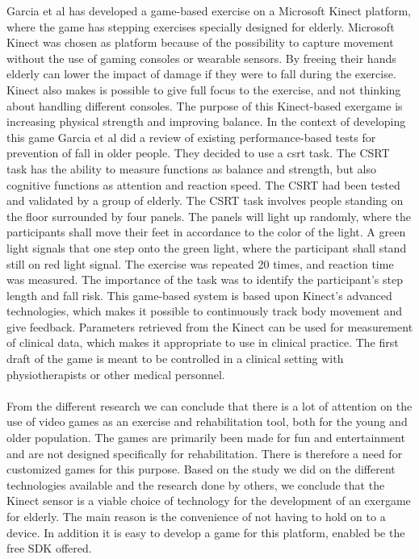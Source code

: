 Garcia et al has developed a game-based exercise on a Microsoft Kinect platform, where the game has stepping exercises specially designed for elderly. Microsoft Kinect was chosen as platform because of the possibility to capture movement without the use of gaming consoles or wearable sensors. By freeing their hands elderly can lower the impact of damage if they were to fall during the exercise. Kinect also makes is possible to give full focus to the exercise, and not thinking about handling different consoles. The purpose of this Kinect-based exergame is increasing physical strength and improving balance. In the context of developing this game Garcia et al did a review of existing performance-based tests for prevention of fall in older people. They decided to use a \ac{csrt} task. The CSRT task has the ability to measure functions as balance and strength, but also cognitive functions as attention and reaction speed. The CSRT had been tested and validated by a group of elderly. The CSRT task involves people standing on the floor surrounded by four panels. The panels will light up randomly, where the participants shall move their feet in accordance to the color of the light. A green light signals that one step onto the green light, where the participant shall stand still on red light signal. The exercise was repeated 20 times, and reaction time was measured. The importance of the task was to identify the participant's step length and fall risk. This game-based system is based upon Kinect's advanced technologies, which makes it possible to continuously track body movement and give feedback. Parameters retrieved from the Kinect can be used for measurement of clinical data, which makes it appropriate to use in clinical practice. The first draft of the game is meant to be controlled in a clinical setting with physiotherapists or other medical personnel. \cite{garcia2012exergames} \\ \\
From the different research we can conclude that there is a lot of attention on the use of video games as an exercise and rehabilitation tool, both for the young and older population. The games are primarily been made for fun and entertainment and are not designed specifically for rehabilitation. There is therefore a need for customized games for this purpose. Based on the study we did on the different technologies available and the research done by others, we conclude that the Kinect sensor is a viable choice of technology for the development of an exergame for elderly. The main reason is the convenience of not having to hold on to a device. In addition it is easy to develop a game for this platform, enabled be the free SDK offered. 





